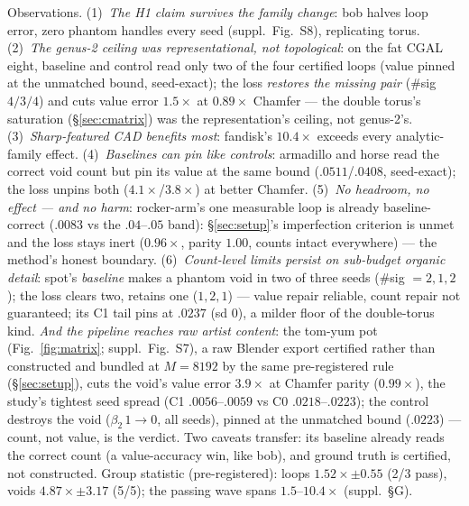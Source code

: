 Observations.
(1)~\emph{The H1 claim survives the family change}: bob halves loop
error, zero phantom handles every seed (suppl.\ Fig.~S8), replicating
torus.
(2)~\emph{The genus-2 ceiling was representational, not topological}:
on the fat CGAL eight, baseline and control read only two of the four
certified loops (value pinned at the unmatched bound, seed-exact); the
loss \emph{restores the missing pair} ($\#$sig $4/3/4$) and cuts value
error $1.5\times$ at $0.89\times$ Chamfer --- the double torus's
saturation (\S\ref{sec:cmatrix}) was the representation's ceiling, not
genus-2's.
(3)~\emph{Sharp-featured CAD benefits most}: fandisk's $10.4\times$
exceeds every analytic-family effect.
(4)~\emph{Baselines can pin like controls}: armadillo and horse read
the correct void count but pin its value at the same bound
($.0511$/$.0408$, seed-exact); the loss unpins both
($4.1\times$/$3.8\times$) at better Chamfer.
(5)~\emph{No headroom, no effect --- and no harm}: rocker-arm's one
measurable loop is already baseline-correct ($.0083$ vs the
$.04$--$.05$ band): \S\ref{sec:setup}'s imperfection criterion is unmet
and the loss stays inert ($0.96\times$, parity $1.00$, counts intact
everywhere) --- the method's honest boundary.
(6)~\emph{Count-level limits persist on sub-budget organic detail}:
spot's \emph{baseline} makes a phantom void in two of three seeds
($\#$sig $=2,1,2$); the loss clears two, retains one ($1,2,1$) ---
value repair reliable, count repair not guaranteed; its C1 tail pins at
$.0237$ (sd $0$), a milder floor of the double-torus kind.
\emph{And the pipeline reaches raw artist content}: the tom-yum pot
(Fig.~\ref{fig:matrix}; suppl.\ Fig.~S7), a raw Blender export
certified rather than constructed and bundled at $M{=}8192$ by the same
pre-registered rule (\S\ref{sec:setup}), cuts the void's value error
$3.9\times$ at Chamfer parity ($0.99\times$), the study's tightest seed
spread (C1 $.0056$--$.0059$ vs C0 $.0218$--$.0223$); the control
destroys the void ($\beta_2\,1{\to}0$, all seeds), pinned at the
unmatched bound ($.0223$) --- count, not value, is the verdict. Two caveats transfer: its baseline already reads the
correct count (a value-accuracy win, like bob), and ground truth is
certified, not constructed.
Group statistic (pre-registered): loops $1.52\times\pm0.55$ (2/3 pass),
voids $4.87\times\pm3.17$ (5/5); the passing wave spans
$1.5$--$10.4\times$ (suppl.\ \S G).
